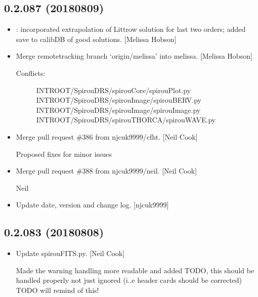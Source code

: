 \documentclass[a4paper,10pt,english]{report}
\begin{document}
\subsection{0.2.087 (2018\sphinxhyphen{}08\sphinxhyphen{}09)}
\label{\detokenize{misc/changelog:id393}}\begin{itemize}
\item {} 
: incorporated extrapolation of Littrow
solution for last two orders; added save to calibDB of good solutions.
{[}Melissa Hobson{]}

\item {} 
Merge remote\sphinxhyphen{}tracking branch ‘origin/melissa’ into melissa. {[}Melissa
Hobson{]}
\begin{description}
\item[{Conflicts:}] \leavevmode
INTROOT/SpirouDRS/spirouCore/spirouPlot.py
INTROOT/SpirouDRS/spirouImage/spirouBERV.py
INTROOT/SpirouDRS/spirouImage/spirouImage.py
INTROOT/SpirouDRS/spirouTHORCA/spirouWAVE.py

\end{description}

\item {} 
Merge pull request \#386 from njcuk9999/cfht. {[}Neil Cook{]}

Proposed fixes for minor issues

\item {} 
Merge pull request \#388 from njcuk9999/neil. {[}Neil Cook{]}

Neil

\item {} 
Update date, version and change log. {[}njcuk9999{]}

\end{itemize}


\subsection{0.2.083 (2018\sphinxhyphen{}08\sphinxhyphen{}08)}
\label{\detokenize{misc/changelog:id394}}\begin{itemize}
\item {} 
Update spirouFITS.py. {[}Neil Cook{]}

Made the warning handling more readable and added TODO, this should be handled properly not just ignored (i..e header cards should be corrected) \sphinxhyphen{} TODO will remind of this!

\end{itemize}
\end{document}
